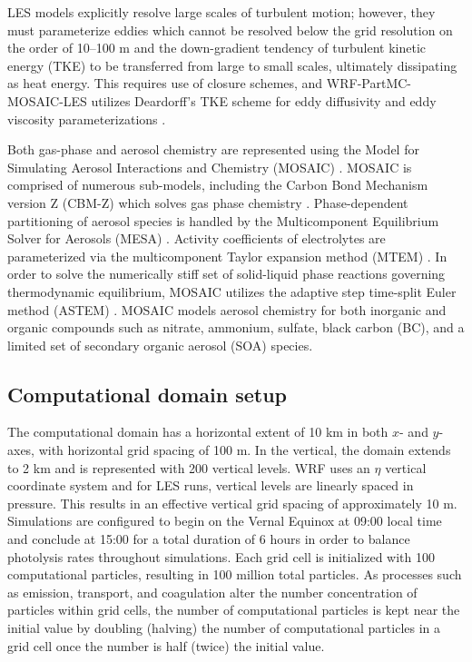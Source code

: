 \documentclass[journal abbreviation, manuscript]{copernicus}
\begin{document}
LES models explicitly resolve large scales of turbulent motion; however, they must parameterize eddies which cannot be resolved below the grid resolution on the order of 10--100 m and the down-gradient tendency of turbulent kinetic energy (TKE) to be transferred from large to small scales, ultimately dissipating as heat energy. This requires use of closure schemes, and WRF-PartMC-MOSAIC-LES utilizes Deardorff's TKE scheme for eddy diffusivity and eddy viscosity parameterizations \citep{deardorff_stratocumulus-capped_1980}.

Both gas-phase and aerosol chemistry are represented using the Model for Simulating Aerosol Interactions and Chemistry (MOSAIC) \citep{zaveri_model_2008}. MOSAIC is comprised of numerous sub-models, including the Carbon Bond Mechanism version Z (CBM-Z) which solves gas phase chemistry \citep{zaveri_new_1999}. Phase-dependent partitioning of aerosol species is handled by the Multicomponent Equilibrium Solver for Aerosols (MESA) \citep{zaveri_computationally_2005}. Activity coefficients of electrolytes are parameterized via the multicomponent Taylor expansion method (MTEM) \citep{zaveri_new_2005}. In order to solve the numerically stiff set of solid-liquid phase reactions governing thermodynamic equilibrium, MOSAIC utilizes the adaptive step time-split Euler method (ASTEM) \citep{zaveri_model_2008}. MOSAIC models aerosol chemistry for both inorganic and organic compounds such as nitrate, ammonium, sulfate, black carbon (BC), and a limited set of secondary organic aerosol (SOA) species. 

\subsection{Computational domain setup}

The computational domain has a horizontal extent of 10 km in both $x$- and $y$-axes, with horizontal grid spacing of 100 m. In the vertical, the domain extends to 2 km and is represented with 200 vertical levels. WRF uses an $\eta$ vertical coordinate system and for LES runs, vertical levels are linearly spaced in pressure. This results in an effective vertical grid spacing of approximately 10 m. Simulations are configured to begin on the Vernal Equinox at 09:00 local time and conclude at 15:00 for a total duration of 6 hours in order to balance photolysis rates throughout simulations. Each grid cell is initialized with 100 computational particles, resulting in 100 million total particles. As processes such as emission, transport, and coagulation alter the number concentration of particles within grid cells, the number of computational particles is kept near the initial value by doubling (halving) the number of computational particles in a grid cell once the number is half (twice) the initial  value. 
\end{document}
